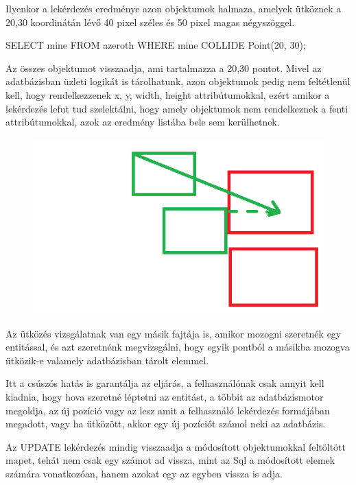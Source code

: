 \begin{sql}
Ilyenkor a lekérdezés eredménye azon objektumok halmaza, amelyek ütköznek a 20,30 koordinátán lévő 40 pixel széles és 50 pixel magas négyszöggel.

\begin{sql}
SELECT mine
FROM azeroth
WHERE mine COLLIDE Point(20, 30);
\end{sql}

Az összes objektumot visszaadja, ami tartalmazza a 20,30 pontot. 
Mivel az adatbázisban üzleti logikát is tárolhatunk, azon objektumok pedig nem feltétlenül kell, hogy rendelkezzenek x, y, width, height attribútumokkal, ezért amikor a lekérdezés lefut tud szelektálni, hogy amely objektumok nem rendelkeznek a fenti attribútumokkal, azok az eredmény listába bele sem kerülhetnek.

\begin{figure}[htb]
\begin{center}
    \includegraphics[scale=0.5]{images/collision}
    \caption{}
    \label{fig:collision}
\end{center}
\end{figure}

Az ütközés vizsgálatnak van egy másik fajtája is, amikor mozogni szeretnék egy entitással, és azt szeretnénk megvizsgálni, hogy egyik pontból a másikba mozogva ütközik-e valamely adatbázisban tárolt elemmel.

Itt a csúszós hatás is garantálja az eljárás, a felhasználónak csak annyit kell kiadnia, hogy hova szeretné léptetni az entitást, a többit az adatbázismotor megoldja, az új pozíció vagy az lesz amit a felhasználó lekérdezés formájában megadott, vagy ha ütközött, akkor egy új pozíciót számol neki az adatbázis.

Az UPDATE lekérdezés mindig visszaadja a módosított objektumokkal feltöltött mapet, tehát nem csak egy számot ad vissza, mint az Sql a módosított elemek számára vonatkozóan, hanem azokat egy az egyben vissza is adja.


\end{sql}

